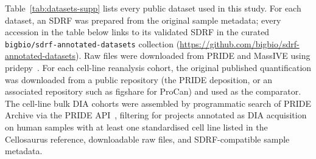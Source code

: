 \documentclass[preprint,12pt]{elsarticle}
\begin{document}
Table~\ref{tab:datasets-supp} lists every public dataset used in this study.
For each dataset, an SDRF was prepared from the original sample metadata; every accession in the table below links to its validated SDRF in the curated \texttt{bigbio/sdrf-annotated-datasets} collection (\url{https://github.com/bigbio/sdrf-annotated-datasets}).
Raw files were downloaded from PRIDE and MassIVE using pridepy~\cite{kamatchinathan2025pridepy}.
For each cell-line reanalysis cohort, the original published quantification was downloaded from a public repository (the PRIDE deposition, or an associated repository such as figshare for ProCan) and used as the comparator.
The cell-line bulk DIA cohorts were assembled by programmatic search of PRIDE Archive via the PRIDE API~\cite{deutsch2026proteomexchange}, filtering for projects annotated as DIA acquisition on human samples with at least one standardised cell line listed in the Cellosaurus reference, downloadable raw files, and SDRF-compatible sample metadata.
\end{document}
